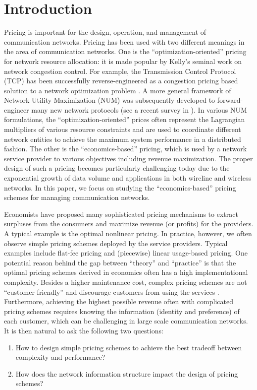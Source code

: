 \documentclass[twocolumn,10pt,twosided]{IEEEtran}
\begin{document}
\section{Introduction}

Pricing is important for the design, operation, and management of communication networks. Pricing has been used with two different meanings in the area of communication networks.  One is the ``optimization-oriented'' pricing for network resource allocation: it is made popular by Kelly's seminal work on network congestion control\cite{kelly1997charging,kelly1998rate}. For example, the  Transmission Control Protocol (TCP) has been successfully reverse-engineered as a congestion pricing based solution to a network optimization problem \cite{low1999optimization,kunniyur2003end}. A more general framework of Network Utility Maximization (NUM) was subsequently developed to forward-engineer many new network protocols (see a recent survey in \cite{chiang2007layering}). In various NUM formulations, the ``optimization-oriented'' prices often represent the Lagrangian multipliers of various resource constraints and are used to coordinate different network entities to achieve the maximum system performance in a distributed fashion. The other is the ``economics-based'' pricing, which is used by a network service provider to various objectives including revenue maximization. The proper design of such a pricing becomes particularly challenging today due to the exponential growth of data volume and applications in both wireline and wireless networks. In this paper, we focus on studying the ``economics-based'' pricing schemes for managing communication networks.


Economists have proposed many sophisticated pricing mechanisms to extract surpluses from the consumers and maximize revenue (or profits) for the providers. A typical example is the optimal nonlinear pricing\cite{mussa1978monopoly, stokey1979intertemporal, maskin1984monopoly}.  In practice, however, we often observe simple pricing schemes deployed by the service providers. Typical examples include flat-fee pricing and (piecewise) linear usage-based pricing. One potential reason behind the gap between ``theory'' and ``practice'' is that the optimal pricing schemes derived in economics often has a high implementational complexity. Besides a higher maintenance cost,  complex pricing schemes are not ``customer-friendly'' and discourage customers from using the services \cite{shakkottai2008price,valancius2011many}.  Furthermore, achieving the highest possible revenue often with complicated pricing schemes requires knowing the information (identity and preference) of each customer, which can be challenging in large scale communication networks. It is then natural to ask the following two questions:
\begin{enumerate}
    \item  How to design simple pricing schemes to achieve the best tradeoff between complexity and performance?
	 \item  How does the network information structure impact the design of pricing schemes?
\end{enumerate}
\end{document}
